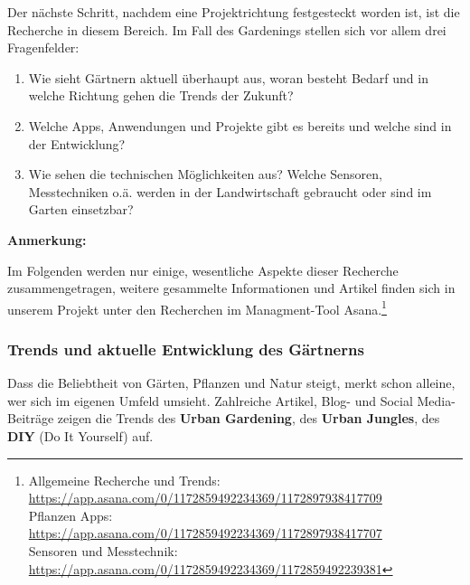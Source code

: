 Der nächste Schritt, nachdem eine Projektrichtung festgesteckt worden
ist, ist die Recherche in diesem Bereich. Im Fall des Gardenings stellen
sich vor allem drei Fragenfelder:

\begin{enumerate}
\def\labelenumi{\arabic{enumi}.}
\tightlist
\item
  Wie sieht Gärtnern aktuell überhaupt aus, woran besteht Bedarf und in
  welche Richtung gehen die Trends der Zukunft?
\item
  Welche Apps, Anwendungen und Projekte gibt es bereits und welche sind
  in der Entwicklung?
\item
  Wie sehen die technischen Möglichkeiten aus? Welche Sensoren,
  Messtechniken o.ä. werden in der Landwirtschaft gebraucht oder sind im
  Garten einsetzbar?
\end{enumerate}

\textbf{Anmerkung:}

Im Folgenden werden nur einige, wesentliche Aspekte dieser Recherche
zusammengetragen, weitere gesammelte Informationen und Artikel finden
sich in unserem Projekt unter den Recherchen im Managment-Tool
Asana.\footnote{Allgemeine Recherche und Trends:
  \url{https://app.asana.com/0/1172859492234369/1172897938417709}\\
  Pflanzen Apps:
  \url{https://app.asana.com/0/1172859492234369/1172897938417707}\\
  Sensoren und Messtechnik:
  \url{https://app.asana.com/0/1172859492234369/1172859492239381}}

\hypertarget{trends-und-aktuelle-entwicklung-des-guxe4rtnerns}{%
\subsubsection{Trends und aktuelle Entwicklung des
Gärtnerns}\label{trends-und-aktuelle-entwicklung-des-guxe4rtnerns}}

Dass die Beliebtheit von Gärten, Pflanzen und Natur steigt, merkt schon
alleine, wer sich im eigenen Umfeld umsieht. Zahlreiche Artikel, Blog-
und Social Media-Beiträge zeigen die Trends des \textbf{Urban
Gardening}, des \textbf{Urban Jungles}, des \textbf{DIY} (Do It
Yourself) auf.

